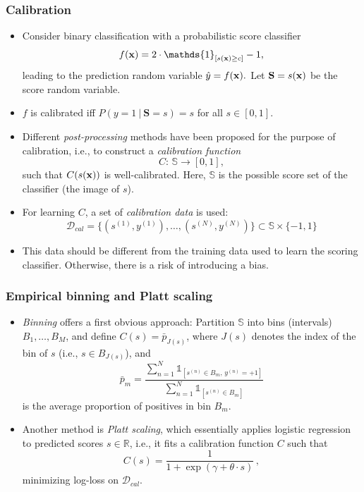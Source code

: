 \documentclass[11pt,compress,t,notes=noshow, xcolor=table]{beamer}
\begin{document}



\sloppy

\begin{frame}[t]
	\frametitle{Calibration}
	\small
	\begin{itemize}
%		
		\item Consider binary classification with a probabilistic score  classifier
%		
		$$\fx = 2 \cdot \mathds{1}_{[ s(\xv) \ge c]} -1,$$
%		
		leading to the prediction random variable $\hat{y} = f(\mathbf{x}).$ Let $\mathbf{S}=s(\mathbf{x})$ be the score random variable. 
%		
		\item $f$ is calibrated iff $P(y=1~|~\mathbf{S}=s) = s$ for all $s\in [0,1].$
%		
		\item Different \emph{post-processing} methods have been proposed for the purpose of calibration, i.e., to construct a \emph{calibration function} 
%		
		$$C: \, \mathbb{S} \to [0,1], $$
		such that $C(s(\mathbf{x}))$ is well-calibrated.
%		
		Here, $\mathbb{S}$ is the possible score set of the classifier (the image of $s$).
		
		\item For learning $C$, a set of \emph{calibration data} is used:
		$$
		\mathcal{D}_{cal} = \big\{ (s^{(1)}, y^{(1)}) , \ldots , (s^{(N)}, y^{(N)}) \big\} \subset \mathbb{S} \times \{ -1 , 1 \}
		$$ 
		
		\item This data should be different from the training data used to learn the scoring classifier. Otherwise, there is a risk of introducing a bias. 
		
	\end{itemize}
\end{frame}

\begin{frame}[t]
	\frametitle{Empirical binning and Platt scaling}
	
	\begin{itemize}
		\item \emph{Binning} offers a first obvious approach: %
		Partition $\mathbb{S}$ into bins (intervals) $B_1, \ldots , B_M$, and define 
		$C(s) = \bar{p}_{J(s)}$, 
		where $J(s)$ denotes the index of the bin of $s$ (i.e., $s \in B_{J(s)}$), and 
		$$
		\bar{p}_m = \frac{\sum_{n=1}^N \mathds{1}_{[ s^{(n)} \in B_m  , \, y^{(n)} = +1  ]} }{\sum_{n=1}^N \mathds{1}_{[ s^{(n)} \in B_m  ]} } 
		$$
		is the average proportion of positives in bin $B_m$.
		
		\item Another method is \emph{Platt scaling}, which essentially applies logistic regression to predicted scores $s \in \mathbb{R}$, i.e., it fits a calibration function $C$ such that
		$$
		C(s) = \frac{1}{1 + \exp( \gamma + \theta \cdot s) } \, ,
		$$
		minimizing log-loss on $\mathcal{D}_{cal}$.
	\end{itemize}
\end{frame}
\end{document}

